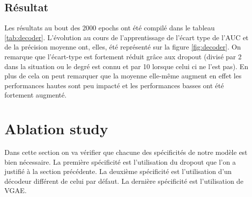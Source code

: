 \documentclass{article}
\begin{document}
\subsection{Résultat}
Les résultats au bout des 2000 epochs ont été compilé dans le tableau \ref{tab:decoder}.
L'évolution au cours de l'apprentissage de l'écart type de l'AUC et de la précision moyenne ont, elles, été représenté sur la figure \ref{fig:decoder}.
On remarque que l'écart-type est fortement réduit grâce aux dropout (divisé par 2 dans la situation ou le degré est connu et par 10 lorsque celui ci ne l'est pas).
En plus de cela on peut remarquer que la moyenne elle-même augment en effet les performances hautes sont peu impacté et les performances basses ont été fortement augmenté.

\begin{table}[H]
    \captionsetup{justification=centering}
    \caption{Résultats de l'utilisation du dropout en presence d'un décodeur. \\ \footnotesize Dans chaque case est indiquée la moyenne et l'écart-type au format : moyenne(écart-type)}
    \label{tab:dropout_decoder}
\end{table}

\section{Ablation study}
Dans cette section on va vérifier que chacune des spécificités de notre modèle est bien nécessaire. 
La première spécificité est l'utilisation du dropout que l'on a justifié à la section précédente. 
La deuxième spécificité est l'utilisation d'un décodeur différent de celui par défaut. 
La dernière spécificité est l'utilisation de VGAE.
\end{document}
